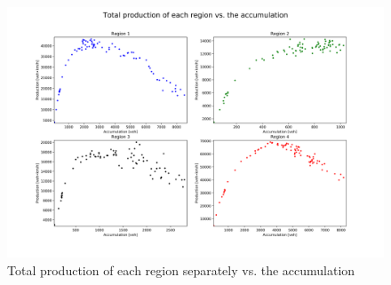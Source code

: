 \documentclass[a4paper, 12pt,oneside]{article}
\begin{document}
\begin{figure}[H]
    \begin{center}
        \includegraphics[width=18cm]{Images/Total production of each region separatly vs. the accumulation.png}
        \caption{Total production of each region separately vs. the accumulation}
        \label{Total production of each region separately vs. the accumulation}
    \end{center}
\end{figure}
\end{document}
